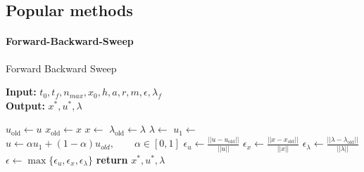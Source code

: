 \subsection{Popular methods}
\paragraph{Forward-Backward-Sweep}
\cite{hackbusch1978numerical}
\begin{algorithm}
	\caption{Forward Backward Sweep } \label{alg:forward_backward_sweep}
    \begin{flushleft}
    	\hspace*{\algorithmicindent} \textbf{Input:} 
    	$t_0, t_f, n_{max}, x_0,h, a, r, m, \epsilon, \lambda_{f}$ \\
    	\hspace*{\algorithmicindent} \textbf{Output:} 
   		$x^*, u^*, \lambda$
   	\end{flushleft}
	\begin{algorithmic}[1]
				\State $u_{\text{old}} \gets u$ 
                \State $x_{\text{old}} \gets x$ 
                \State $ x \gets$
                \State $\lambda_{\text{old}} \gets \lambda $
				\State $\lambda \gets$ 
                \State $u_1 \gets$ 
                \State 
                	$u \gets \alpha u_1 + (1-\alpha)u_{old}, 
                	\qquad \alpha \in [0, 1]$
                \State 
                	$\epsilon_u \gets \displaystyle 
                	\frac{||u - u_{\text{old}}||}{||u||}$
                \State 
                	$\epsilon_x \gets \displaystyle 
                	\frac{||x - x_{\text{old}}||}{||x||}$
                \State 
                	$\epsilon_{\lambda} \gets \displaystyle 
                	\frac{||\lambda - \lambda_{\text{old}}||}{||\lambda||}$
                \State 
                	$\epsilon \gets 
                		\max{ 
                			\{ \epsilon_u, \epsilon_x, \epsilon_{\lambda} \}
                		}$
			\EndWhile\label{}
			\State \textbf{return} $ x^*, u^*, \lambda$
		\EndProcedure
	\end{algorithmic}
\end{algorithm}
